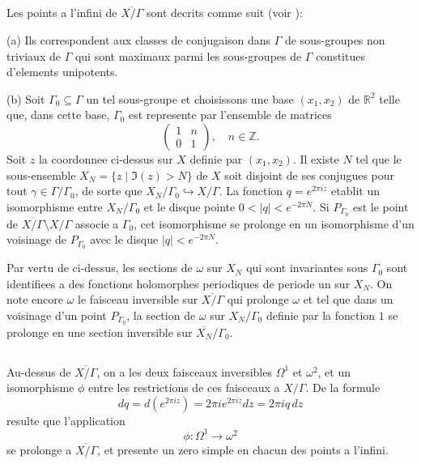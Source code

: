 \documentclass[11pt,reqno]{amsart}
\theoremstyle{plain}
\theoremstyle{remark}
\newcommand{\Z}{\mathbb{Z}}
\newcommand{\R}{\mathbb{R}}
\numberwithin{equation}{section}
\begin{document}
\subsection{}\label{subsec:2.6}

Les points a l'infini de $\overline{X/\Gamma}$ sont decrits comme suit (voir \cite{Verdier}):

(a) Ils correspondent aux classes de conjugaison dans $\Gamma$ de sous-groupes non triviaux de $\Gamma$ qui sont maximaux parmi les sous-groupes de $\Gamma$ constitues d'elements unipotents.

(b) Soit $\Gamma_0 \subseteq \Gamma$ un tel sous-groupe et choisissons une base $(x_1, x_2)$ de $\R^2$ telle que, dans cette base, $\Gamma_0$ est represente par l'ensemble de matrices
\[
\begin{pmatrix} 1 & n \\ 0 & 1 \end{pmatrix}, \quad n \in \Z.
\]
Soit $z$ la coordonnee ci-dessus sur $X$ definie par $(x_1, x_2)$. Il existe $N$ tel que le sous-ensemble $X_N = \{z \mid \Im(z) > N\}$ de $X$ soit disjoint de ses conjugues pour tout $\gamma \in \Gamma/\Gamma_0$, de sorte que $X_N/\Gamma_0 \hookrightarrow X/\Gamma$. La fonction $q = e^{2\pi i z}$ etablit un isomorphisme entre $X_N/\Gamma_0$ et le disque pointe $0 < |q| < e^{-2\pi N}$. Si $P_{\Gamma_0}$ est le point de $\overline{X/\Gamma} \setminus X/\Gamma$ associe a $\Gamma_0$, cet isomorphisme se prolonge en un isomorphisme d'un voisinage de $P_{\Gamma_0}$ avec le disque $|q| < e^{-2\pi N}$.

Par vertu de ci-dessus, les sections de $\omega$ sur $X_N$ qui sont invariantes sous $\Gamma_0$ sont identifiees a des fonctions holomorphes periodiques de periode un sur $X_N$. On note encore $\omega$ le faisceau inversible sur $\overline{X/\Gamma}$ qui prolonge $\omega$ et tel que dans un voisinage d'un point $P_{\Gamma_0}$, la section de $\omega$ sur $X_N/\Gamma_0$ definie par la fonction $1$ se prolonge en une section inversible sur $\overline{X_N}/\Gamma_0$.

\subsection{}\label{subsec:2.7}

Au-dessus de $\overline{X/\Gamma}$, on a les deux faisceaux inversibles $\Omega^1$ et $\omega^2$, et un isomorphisme $\phi$ entre les restrictions de ces faisceaux a $X/\Gamma$. De la formule
\[
dq = d(e^{2\pi i z}) = 2\pi i e^{2\pi i z} dz = 2\pi i q \, dz
\]
resulte que l'application
\[
\phi: \Omega^1 \to \omega^2
\]
se prolonge a $\overline{X/\Gamma}$, et presente un zero simple en chacun des points a l'infini.
\end{document}
